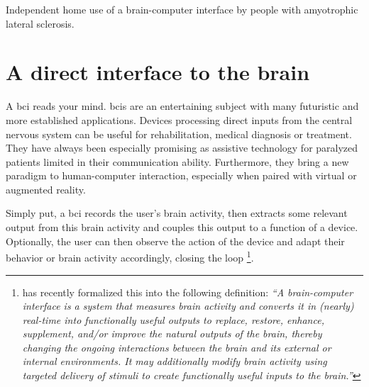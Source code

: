 Independent home use of a brain-computer interface by people with
amyotrophic lateral sclerosis.


\section{A direct interface to the brain}
A \ac{bci} reads your mind.
\ac{bci}s are an entertaining subject with many futuristic and more established
applications.
Devices processing direct inputs from the central nervous system can be
useful for rehabilitation, medical diagnosis or treatment.
They have always been especially promising as assistive technology for
paralyzed patients limited in their communication ability. 
Furthermore, they bring a new paradigm to human-computer interaction,
especially when paired with virtual or augmented reality.

Simply put, a \ac{bci} records the user's brain activity, then extracts some
relevant output from this brain activity and couples this output to a function
of a device.
Optionally, the user can then observe the action of the device and adapt their
behavior or brain activity accordingly, closing the loop
\footnote{
  \textcite{BCISociety2024} has recently formalized this into the
  following definition:
  \it``A brain-computer interface is a system that measures brain activity and
  converts it in (nearly) real-time into functionally useful outputs to replace,
  restore, enhance, supplement, and/or improve the natural outputs of the brain,
  thereby changing the ongoing interactions between the brain and its external or
  internal environments. It may additionally modify brain activity using targeted
  delivery of stimuli to create functionally useful inputs to the
  brain.''
}.

